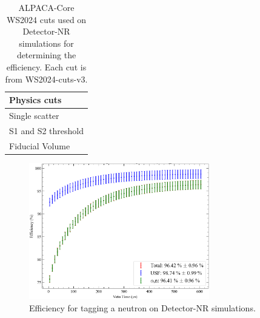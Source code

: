 \begin{table}[!ht]
	\centering
	\caption{ALPACA-Core WS2024 cuts used on Detector-NR simulations for determining the efficiency. Each cut is from WS2024-cuts-v3.}
	\begin{tabular}{l}
    \hline\hline
		\textbf{Physics cuts}        \\
		\hline
		Single scatter      \\
		S1 and S2 threshold \\
		Fiducial Volume\\
        \hline\hline
	\end{tabular}
	\label{tab:VetoEff/detector_nr_simulation_efficiency_cuts}
\end{table}

\begin{figure}[!ht]
	\centering
	\includegraphics[width=0.7\textwidth]{figures/VetoEfficiency/det_nr_efficiency.png}
	\caption{Efficiency for tagging a neutron on Detector-NR simulations.}
	\label{fig:VetoEff/detector_nr_efficiency}
\end{figure}

\clearpage
